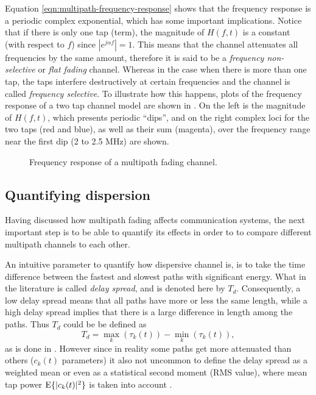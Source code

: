 Equation \eqref{eqn:multipath-frequency-response} shows that the frequency response is a periodic complex exponential, which has some important implications. Notice that if there is only one tap (term), the magnitude of \(H(f, t)\) is a constant (with respect to \(f\)) since \(|e^{j\alpha f}| = 1\). This means that the channel attenuates all frequencies by the same amount, therefore it is said to be a \emph{frequency non-selective} or \emph{flat fading} channel. Whereas in the case when there is more than one tap, the taps interfere destructively at certain frequencies and the channel is called \emph{frequency selective}. To illustrate how this happens, plots of the frequency response of a two tap channel model are shown in . On the left is the magnitude of \(H(f, t)\), which presents periodic ``dips'', and on the right complex loci for the two taps (red and blue), as well as their sum (magenta), over the frequency range near the first dip (2 to 2.5 MHz) are shown.


\begin{figure}
	\centering
	\resizebox{\linewidth}{!}{
		
	}
	\caption{
		Frequency response of a multipath fading channel.
		\label{fig:multipath-frequency-response-plots}
	}
\end{figure}

\subsection{Quantifying dispersion}

Having discussed how multipath fading affects communication systems, the next important step is to be able to quantify its effects in order to to compare different multipath channels to each other.

An intuitive parameter to quantify how dispersive channel is, is to take the time difference between the fastest and slowest paths with significant energy. What in the literature is called \emph{delay spread}, and is denoted here by \(T_d\). Consequently, a low delay spread means that all paths have more or less the same length, while a high delay spread implies that there is a large difference in length among the paths. Thus \(T_d\) could be be defined as
\begin{equation}
	T_d = \max_{k} (\tau_k(t)) -  \min_{k} (\tau_k(t)),
\end{equation}
as is done in \cite{Gallager}. However since in reality some paths get more attenuated than others (\(c_k(t)\) parameters) it also not uncommon to define the delay spread as a weighted mean or even as a statistical second moment (RMS value), where mean tap power \(\operatorname{E}\{|c_k(t)|^2\}\) is taken into account \cite{Mathis,Messier}. %

